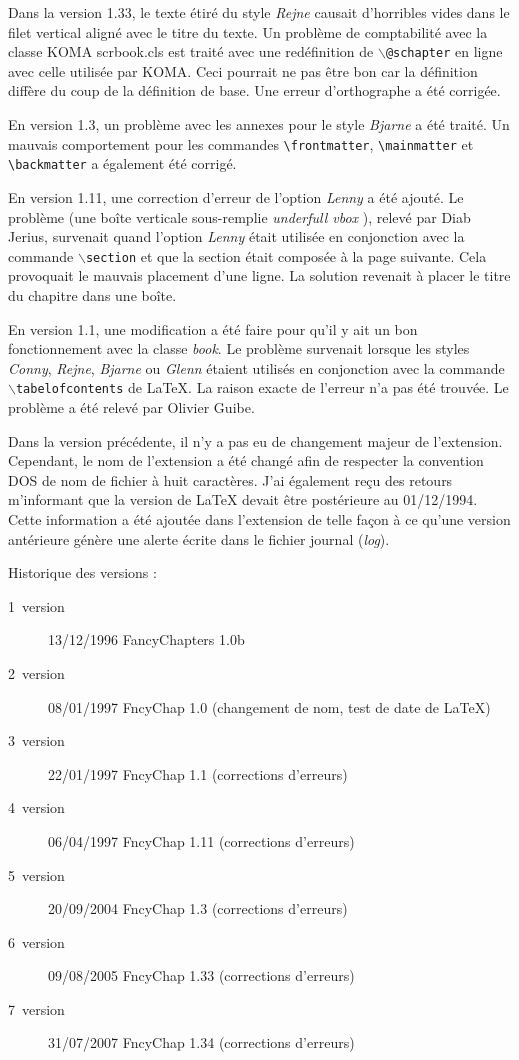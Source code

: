 \documentclass{report}
\newcommand{\A}[1]{{$\backslash${\tt #1}}}
\begin{document}
    Dans la version 1.33, le texte étiré du style \emph{Rejne} causait 
    d'horribles vides dans le filet vertical aligné avec le titre du texte. Un 
    problème de comptabilité avec la classe KOMA \og scrbook.cls \fg{}
    est traité avec une redéfinition de \A{@schapter} en ligne avec celle 
    utilisée par KOMA. Ceci pourrait ne pas être bon car la définition diffère
    du coup de la définition de base. Une erreur d'orthographe a été corrigée.

    En version 1.3, un problème avec les annexes pour le style \emph{Bjarne} a 
    été traité. Un mauvais comportement pour les commandes 
    \verb+\frontmatter+, \verb+\mainmatter+ et \verb+\backmatter+ a également 
    été corrigé.

    En version 1.11, une correction d'erreur de l'option \emph{Lenny} a été 
    ajouté. Le problème (une boîte verticale sous-remplie \og \emph{underfull
    vbox} \fg{}), relevé par Diab Jerius, survenait quand l'option \emph{Lenny}
    était utilisée en conjonction avec la commande \A{section} et que la 
    section était composée à la page suivante. Cela provoquait le mauvais 
    placement d'une ligne. La solution revenait à placer le titre du chapitre
    dans une boîte.

    En version 1.1, une modification a été faire pour qu'il y ait un bon 
    fonctionnement avec la classe \emph{book}. Le problème survenait lorsque 
    les styles \emph{Conny}, \emph{Rejne}, \emph{Bjarne} ou \emph{Glenn} 
    étaient utilisés en conjonction avec la commande  \A{tabelofcontents} 
    de \LaTeX{}. La raison exacte de l'erreur n'a pas été trouvée. Le 
    problème a été relevé par Olivier Guibe.

    Dans la version précédente, il n'y a pas eu de changement majeur de 
    l'extension. Cependant, le nom de l'extension a été changé afin de 
    respecter la convention DOS de nom de fichier à huit caractères. J'ai
    également reçu des retours m'informant que la version de \LaTeX{} devait
    être postérieure au 01/12/1994. Cette information a été ajoutée dans 
    l'extension de telle façon à ce qu'une version antérieure génère une
    alerte écrite dans le fichier journal (\emph{log}).

    Historique des versions :
      \begin{description}
        \item[1\iere\ version] 13/12/1996 FancyChapters 1.0b
        \item[2\ieme\ version] 08/01/1997 FncyChap 1.0 (changement de nom, test de 
          date de \LaTeX)
        \item[3\ieme\ version] 22/01/1997 FncyChap 1.1 (corrections d'erreurs)
        \item[4\ieme\ version] 06/04/1997 FncyChap 1.11 (corrections d'erreurs)
        \item[5\ieme\ version] 20/09/2004 FncyChap 1.3 (corrections d'erreurs)
        \item[6\ieme\ version] 09/08/2005 FncyChap 1.33 (corrections d'erreurs)
        \item[7\ieme\ version] 31/07/2007 FncyChap 1.34 (corrections d'erreurs)
      \end{description}
\end{document}
